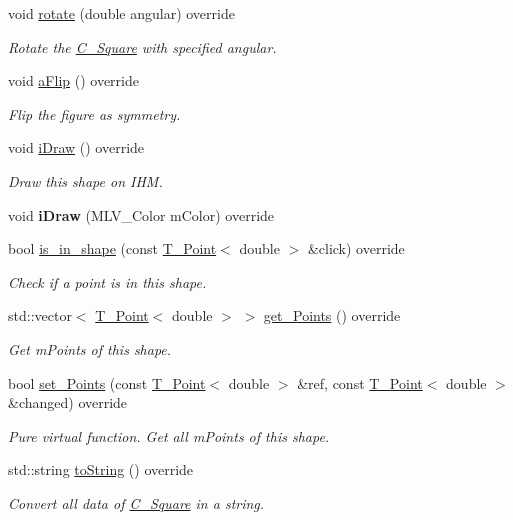 \begin{DoxyCompactItemize}
void \hyperlink{classSquare_a5714e182c30f996b78e74e1badd054a2}{rotate} (double angular) override
\begin{DoxyCompactList}\small\item\em Rotate the \hyperlink{classSquare}{C_Square} with specified angular. \end{DoxyCompactList}\item
\mbox{\label{classSquare_a2d56ff842244af8f2fdc85b7e5ce76f3}} 
void \hyperlink{classSquare_a2d56ff842244af8f2fdc85b7e5ce76f3}{aFlip} () override
\begin{DoxyCompactList}\small\item\em Flip the figure as symmetry. \end{DoxyCompactList}\item 
\mbox{\label{classSquare_a4edbdf9ae0519cc1823f4dbbaa6bbf4c}} 
void \hyperlink{classSquare_a4edbdf9ae0519cc1823f4dbbaa6bbf4c}{iDraw} () override
\begin{DoxyCompactList}\small\item\em Draw this shape on I\+HM. \end{DoxyCompactList}\item 
\mbox{\label{classSquare_ad1764054d43f5c91530e5067c3db42e0}} 
void {\bfseries iDraw} (M\+L\+V\+\_\+\+Color mColor) override
\item 
bool \hyperlink{classSquare_ada046df2d9fb92286d106d4b3475980a}{is\+\_\+in\+\_\+shape} (const \hyperlink{classPoint}{T_Point}$<$ double $>$ \&click) override
\begin{DoxyCompactList}\small\item\em Check if a point is in this shape. \end{DoxyCompactList}\item 
std\+::vector$<$ \hyperlink{classPoint}{T_Point}$<$ double $>$ $>$ \hyperlink{classSquare_a2a8fb1bfd2f3464cee813ec8b277506e}{get\+\_\+\+Points} () override
\begin{DoxyCompactList}\small\item\em Get mPoints of this shape. \end{DoxyCompactList}\item
bool \hyperlink{classSquare_ac474644483fa85f7a4f39969f34868fe}{set\+\_\+\+Points} (const \hyperlink{classPoint}{T_Point}$<$ double $>$ \&ref, const \hyperlink{classPoint}{T_Point}$<$ double $>$ \&changed) override
\begin{DoxyCompactList}\small\item\em Pure virtual function. Get all mPoints of this shape. \end{DoxyCompactList}\item
std\+::string \hyperlink{classSquare_aa5d7db8004bba3c400f57513d93b21d4}{to\+String} () override
\begin{DoxyCompactList}\small\item\em Convert all data of \hyperlink{classSquare}{C_Square} in a string. \end{DoxyCompactList}\end{DoxyCompactItemize}
